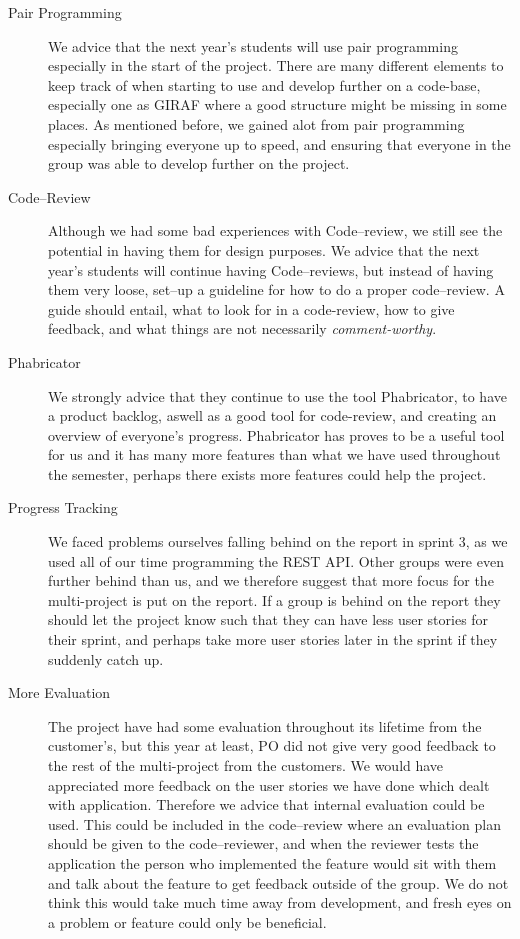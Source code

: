\begin{description}
	\item[Pair Programming] We advice that the next year's students will use pair programming especially in the start of the project.
	There are many different elements to keep track of when starting to use and develop further on a code-base, especially one as GIRAF where a good structure might be missing in some places.
	As mentioned before, we gained alot from pair programming especially bringing everyone up to speed, and ensuring that everyone in the group was able to develop further on the project.

	\item[Code--Review] Although we had some bad experiences with Code--review, we still see the potential in having them for design purposes.
	We advice that the next year's students will continue having Code--reviews, but instead of having them very loose, set--up a guideline for how to do a proper code--review.
	A guide should entail, what to look for in a code-review, how to give feedback, and what things are not necessarily \textit{comment-worthy}.

	\item[Phabricator] We strongly advice that they continue to use the tool Phabricator, to have a product backlog, aswell as a good tool for code-review, and creating an overview of everyone's progress.
	Phabricator has proves to be a useful tool for us and it has many more features than what we have used throughout the semester, perhaps there exists more features could help the project.

	\item[Progress Tracking] We faced problems ourselves falling behind on the report in sprint 3, as we used all of our time programming the REST API.
	Other groups were even further behind than us, and we therefore suggest that more focus for the multi-project is put on the report.
	If a group is behind on the report they should let the project know such that they can have less user stories for their sprint, and perhaps take more user stories later in the sprint if they suddenly catch up.

	\item[More Evaluation] The project have had some evaluation throughout its lifetime from the customer's, but this year at least, PO did not give very good feedback to the rest of the multi-project from the customers.
	We would have appreciated more feedback on the user stories we have done which dealt with application.
	Therefore we advice that internal evaluation could be used.
	This could be included in the code--review where an evaluation plan should be given to the code--reviewer, and when the reviewer tests the application the person who implemented the feature would sit with them and talk about the feature to get feedback outside of the group.
	We do not think this would take much time away from development, and fresh eyes on a problem or feature could only be beneficial.


\end{description}

